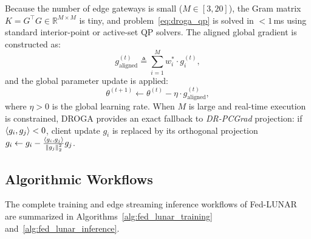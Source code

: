 Because the number of edge gateways is small ($M \in [3, 20]$), the Gram matrix $K = G^\top G \in \mathbb{R}^{M \times M}$ is tiny, and problem~\eqref{eq:droga_qp} is solved in $<1$\,ms using standard interior-point or active-set QP solvers. The aligned global gradient is constructed as:
\begin{equation}
\label{eq:aligned_update}
g_{\text{aligned}}^{(t)} \triangleq \sum_{i=1}^M w_i^* \cdot g_i^{(t)},
\end{equation}
and the global parameter update is applied:
\begin{equation}
\theta^{(t+1)} \leftarrow \theta^{(t)} - \eta \cdot g_{\text{aligned}}^{(t)},
\end{equation}
where $\eta > 0$ is the global learning rate. When $M$ is large and real-time execution is constrained, DROGA provides an exact fallback to \emph{DR-PCGrad} projection: if $\left\langle g_i,g_j\right\rangle < 0$, client update $g_i$ is replaced by its orthogonal projection $g_i \leftarrow g_i - \frac{\left\langle g_i,g_j\right\rangle}{\left\lVert g_j\right\rVert_2^2} g_j$.

\subsection{Algorithmic Workflows}
\label{subsec:algorithms}

The complete training and edge streaming inference workflows of Fed-LUNAR are summarized in Algorithms~\ref{alg:fed_lunar_training} and~\ref{alg:fed_lunar_inference}.

